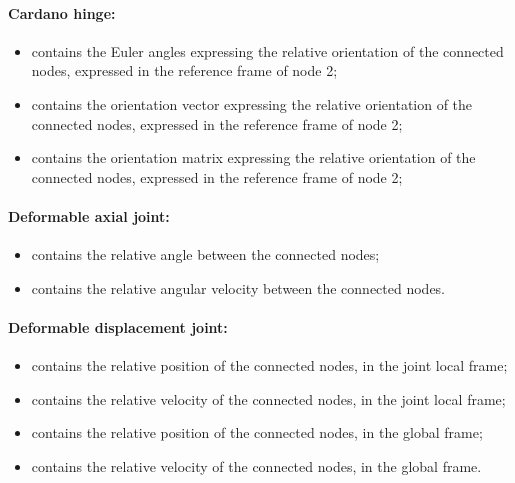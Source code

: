 \paragraph{Cardano hinge:}
\begin{itemize}
\item {} contains the Euler angles 
  expressing the relative orientation of the connected nodes, expressed in 
  the reference frame of node 2;
\item {} contains the orientation vector
  expressing the relative orientation of the connected nodes, expressed in 
  the reference frame of node 2;
\item {} contains the orientation matrix
  expressing the relative orientation of the connected nodes, expressed in 
  the reference frame of node 2;
\end{itemize}

\paragraph{Deformable axial joint:}
\begin{itemize}
\item {} contains the relative angle 
  between the connected nodes;
\item {} contains the relative angular
  velocity between the connected nodes. 
\end{itemize}

\paragraph{Deformable displacement joint:}
\begin{itemize}
\item {} contains the relative position
  of the connected nodes, in the joint local frame;
\item {} contains the relative velocity
  of the connected nodes, in the joint local frame;
\item {} contains the relative position
  of the connected nodes, in the global frame;
\item {} contains the relative velocity
  of the connected nodes, in the global frame. 
\end{itemize}

